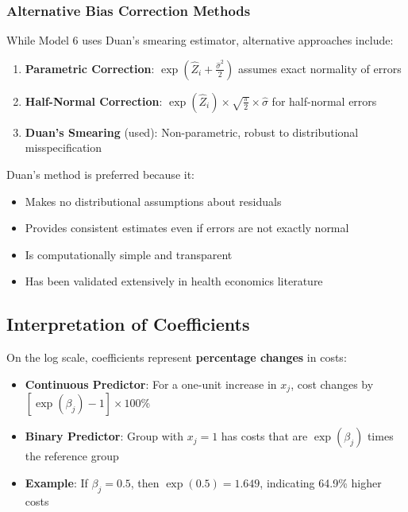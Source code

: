 \subsubsection{Alternative Bias Correction Methods}

While Model 6 uses Duan's smearing estimator, alternative approaches include:

\begin{enumerate}
    \item \textbf{Parametric Correction}: $\exp(\hat{Z}_i + \frac{\hat{\sigma}^2}{2})$ assumes exact normality of errors
    \item \textbf{Half-Normal Correction}: $\exp(\hat{Z}_i) \times \sqrt{\frac{\pi}{2}} \times \hat{\sigma}$ for half-normal errors
    \item \textbf{Duan's Smearing} (used): Non-parametric, robust to distributional misspecification
\end{enumerate}

Duan's method is preferred because it:
\begin{itemize}
    \item Makes no distributional assumptions about residuals
    \item Provides consistent estimates even if errors are not exactly normal
    \item Is computationally simple and transparent
    \item Has been validated extensively in health economics literature
\end{itemize}

\subsection{Interpretation of Coefficients}

On the log scale, coefficients represent \textbf{percentage changes} in costs:

\begin{itemize}
    \item \textbf{Continuous Predictor}: For a one-unit increase in $x_j$, cost changes by $[\exp(\beta_j) - 1] \times 100$\%
    \item \textbf{Binary Predictor}: Group with $x_j = 1$ has costs that are $\exp(\beta_j)$ times the reference group
    \item \textbf{Example}: If $\beta_j = 0.5$, then $\exp(0.5) = 1.649$, indicating 64.9\% higher costs
\end{itemize}

